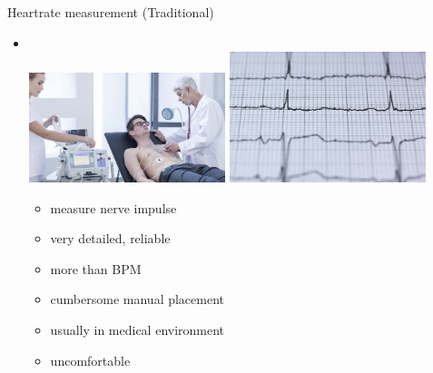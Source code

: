 \documentclass{beamer}
\begin{document}
\begin{frame}{Heartrate measurement (Traditional)}
\begin{itemize}
	\item {}\\
		\vspace{0.2cm}
		\includegraphics[width=0.45\textwidth, height=0.3\paperheight]{ekg.jpg}
		\hfill
		\includegraphics[width=0.45\textwidth, height=0.3\paperheight]{cardiogram.jpg}\\
		\noindent
		\begin{minipage}[t]{0.45\textwidth}
			\begin{itemize}[label=\positiveaspect]
				\item measure nerve impulse \pause
				\item very detailed, reliable \pause
				\item more than BPM \pause
			\end{itemize}
		\end{minipage}
		\hfill\vline\hfill
		\begin{minipage}[t]{0.45\textwidth}
			\begin{itemize}[label=\negativeaspect]
				\item cumbersome manual placement \pause
				\item usually in medical environment \pause
				\item uncomfortable
					
			\end{itemize}
		\end{minipage}
\end{itemize}
\end{frame}
\end{document}

